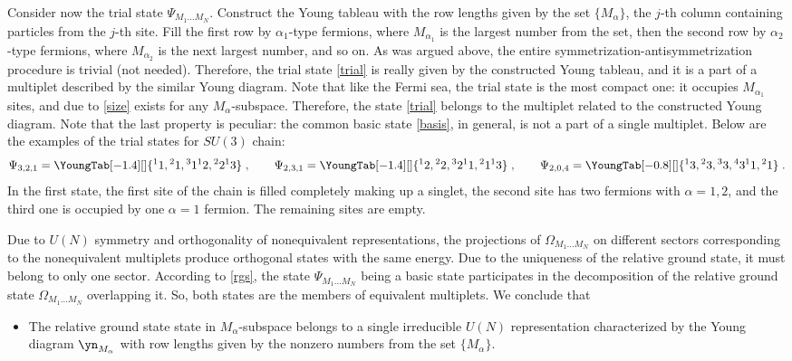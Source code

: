 Consider now the trial  state $\Psi_{M_1\dots M_N}$.  Construct the Young tableau
with the row lengths given by the set $\{M_\alpha\}$, the $j$-th column containing particles from the $j$-th site.
Fill the f\/irst row by  $\alpha_1$-type fermions, where $M_{\alpha_1}$ is the largest number from the set, then
the second row  by  $\alpha_2$-type fermions, where $M_{\alpha_2}$ is the next largest number,
and so on. As was argued above,  the entire symmetrization-antisymmetrization
procedure is trivial (not needed).
Therefore, the trial state \eqref{trial} is really given  by the constructed Young tableau,
and it is a part of a multiplet described by the similar Young diagram.
Note that like the Fermi sea, the trial state is the most compact one: it occupies $M_{\alpha_1}$ sites,
and due to \eqref{size}  exists for any $M_\alpha$-subspace.
Therefore, the state \eqref{trial} belongs to the multiplet related to the
constructed Young diagram. Note that the last property is peculiar: the
common basic  state \eqref{basis}, in general, is not a part of a single multiplet.
Below are the examples of the trial states for $SU(3)$ chain:
\[
\Psi_{3,2,1} =\YoungTab[-1.4][\normalsize]{ {{}^1 1,{}^2 1,{}^3 1} {{}^1 2,{}^2 2 } {{}^1 3 }}
\;,
\qquad
\Psi_{2,3,1}=\YoungTab[-1.4][\normalsize]{ {{}^1 2,{}^2 2,{}^3 2} {{}^1 1,{}^2 1 } {{}^1 3 }}
\;,
\qquad
\Psi_{2,0,4}=\YoungTab[-0.8][\normalsize]{ {{}^1 3,{}^2 3,{}^3 3, {}^4 3 } {{}^1 1,{}^2 1 } }
\;.
\]
In the f\/irst state, the f\/irst site of the chain is f\/illed completely making up a singlet,
the second site has two fermions with $\alpha=1,2$, and the third one is occupied by one $\alpha=1$ fermion.
The remaining sites are empty.

Due to $U(N)$ symmetry and orthogonality of nonequivalent representations,
the projections of
$\Omega_{M_1\dots M_N}$ on dif\/ferent sectors corresponding to the nonequivalent
multiplets produce orthogonal states with the same energy.
Due to the uniqueness of the relative ground state, it must belong to only one sector.
According to \eqref{rgs}, the state $\Psi_{M_1\dots M_N}$ being a basic state
participates in the decomposition of the relative ground state $\Omega_{M_1\dots M_N}$
overlapping it. So, both states are the members of equivalent multiplets.
We conclude that
\begin{itemize}\itemsep=0pt
\item
The relative ground state state in $M_\alpha$-subspace
belongs to a single irreducible $U(N)$ representation
characterized by the Young diagram $\yn_{M_\alpha}$
with row lengths given by the nonzero numbers from the set $\{M_\alpha\}$.
\end{itemize}



